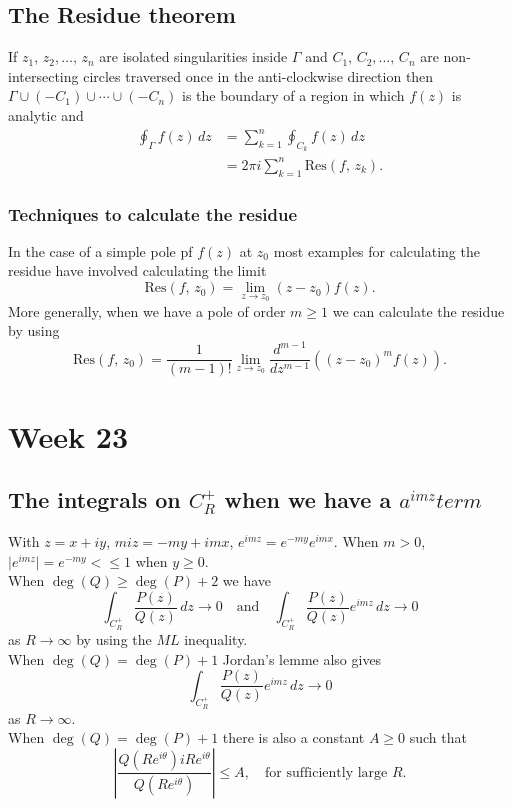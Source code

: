 \documentclass{article}
\begin{document}
\subsection{The Residue theorem}
If $z_1,\,z_2,\ldots,\,z_n$ are isolated singularities inside $\Gamma$ and $C_1,\,C_2,\ldots,\,C_n$ are non-intersecting circles traversed once in the anti-clockwise direction then $\Gamma\cup(-C_1)\cup\cdots\cup(-C_n)$ is the boundary of a region in which $f(z)$ is analytic and
\begin{align}
    \oint_\Gamma f(z)\,dz &= \sum_{k=1}^n \oint_{C_k}f(z)\,dz \\
    &= 2\pi i\sum_{k=1}^n \text{Res}(f,\,z_k).
\end{align}

\subsubsection{Techniques to calculate the residue}
In the case of a simple pole pf $f(z)$ at $z_0$ most examples for calculating the residue have involved calculating the limit 
\begin{equation}
    \text{Res}(f,\,z_0) = \lim_{z\to z_0} (z-z_0)f(z).
\end{equation}
More generally, when we have a pole of order $m\geq 1$ we can calculate the residue by using
\begin{equation}
    \text{Res}(f,\,z_0) = \frac{1}{(m-1)!}\lim_{z\to z_0}\frac{d^{m-1}}{dz^{m-1}}((z-z_0)^m f(z)).
\end{equation}


\section{Week 23}
\subsection{The integrals on $C_R^+$ when we have a $a^{imz} term$}
With $z = x+iy$, $miz = -my + imx$, $e^{imz} = e^{-my}e^{imx}$. When $m>0$, $\vert e^{imz}\vert = e^{-my}<\leq 1$ when $y\geq 0$.\\
When $\deg(Q)\geq\deg(P)+2$ we have
\begin{equation}
    \int_{C_R^+} \frac{P(z)}{Q(z)}\,dz\to 0\quad\text{and}\quad \int_{C_R^+} \frac{P(z)}{Q(z)}e^{imz}\,dz\to 0
\end{equation}
as $R\to\infty$ by using the $ML$ inequality. \\
When $\deg(Q) = \deg(P) + 1$ Jordan's lemme also gives
\begin{equation}
    \int_{C_R^+} \frac{P(z)}{Q(z)}e^{imz}\,dz\to 0
\end{equation}
as $R\to \infty$.\\
When $\deg(Q)=\deg(P)+1$ there is also a constant $A\geq0$ such that 
\begin{equation}
    \left\vert \frac{Q(Re^{i\theta})iRe^{i\theta}}{Q(Re^{i\theta})} \right\vert\leq A,\quad\text{for sufficiently large }R.
\end{equation}
\end{document}
